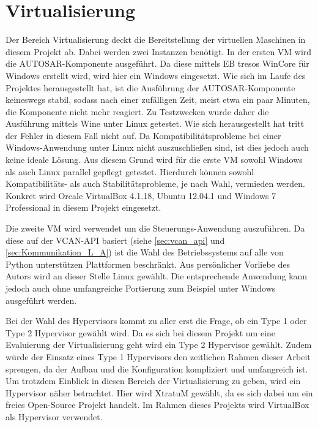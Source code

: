 \documentclass[
  a4paper,					    %
  twoside,
  DIV=calc,     				%
  bibliography=totoc,
  cleardoublepage=empty,
  ngerman,     					%
  final       					%
]{scrbook}
\begin{document}
\section{Virtualisierung}
\label{sec:Virtualisierung_Umgesetzt}
Der Bereich Virtualisierung deckt die Bereitstellung der virtuellen Maschinen in diesem Projekt ab. Dabei werden zwei Instanzen benötigt. In der ersten VM wird die AUTOSAR-Komponente ausgeführt. Da diese mittels EB tresos WinCore für Windows erstellt wird, wird hier ein Windows eingesetzt. Wie sich im Laufe des Projektes herausgestellt hat, ist die Ausführung der AUTOSAR-Komponente keineswegs stabil, sodass nach einer zufälligen Zeit, meist etwa ein paar Minuten, die Komponente nicht mehr reagiert. Zu Testzwecken wurde daher die Ausführung mittels Wine unter Linux getestet. Wie sich herausgestellt hat tritt der Fehler in diesem Fall nicht auf. Da Kompatibilitätsprobleme bei einer Windows-Anwendung unter Linux nicht auszuschließen sind, ist dies jedoch auch keine ideale Lösung. Aus diesem Grund wird für die erste VM sowohl Windows als auch Linux parallel gepflegt getestet. Hierdurch können sowohl Kompatibilitäts- als auch Stabilitätsprobleme, je nach Wahl, vermieden werden. Konkret wird Orcale VirtualBox 4.1.18, Ubuntu 12.04.1 und Windows 7 Professional in diesem Projekt eingesetzt.

Die zweite VM wird verwendet um die Steuerungs-Anwendung auszuführen. Da diese auf der VCAN-API basiert (siehe \ref{sec:vcan_api} und \ref{sec:Kommunikation_L_A}) ist die Wahl des Betriebssystems auf alle von Python unterstützen Plattformen beschränkt. Aus persönlicher Vorliebe des Autors wird an dieser Stelle Linux gewählt. Die entsprechende Anwendung kann jedoch auch ohne umfangreiche Portierung zum Beispiel unter Windows ausgeführt werden.

Bei der Wahl des Hypervisors kommt zu aller erst die Frage, ob ein Type 1 oder Type 2 Hypervisor gewählt wird. Da es sich bei diesem Projekt um eine Evaluierung der Virtualisierung geht wird ein Type 2 Hypervisor gewählt. Zudem würde der Einsatz eines Type 1 Hypervisors den zeitlichen Rahmen dieser Arbeit sprengen, da der Aufbau und die Konfiguration kompliziert und umfangreich ist. Um trotzdem Einblick in diesen Bereich der Virtualisierung zu geben, wird ein Hypervisor näher betrachtet. Hier wird XtratuM gewählt, da es sich dabei um ein freies Open-Source Projekt handelt. Im Rahmen dieses Projekts wird VirtualBox als Hypervisor verwendet.
\end{document}
